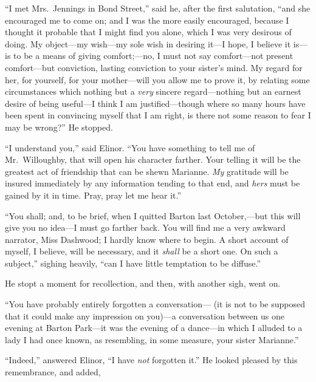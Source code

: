 ``I met Mrs.\ Jennings in Bond Street,'' said he,
after the first salutation, ``and she encouraged me
to come on; and I was the more easily encouraged,
because I thought it probable that I might find you alone,
which I was very desirous of doing.  My object---my
wish---my sole wish in desiring it---I hope, I believe
it is---is to be a means of giving comfort;---no, I must
not say comfort---not present comfort---but conviction,
lasting conviction to your sister's mind.  My regard for her,
for yourself, for your mother---will you allow me to prove it,
by relating some circumstances which nothing but a \emph{very}
sincere regard---nothing but an earnest desire of being
useful---I think I am justified---though where so many hours
have been spent in convincing myself that I am right,
is there not some reason to fear I may be wrong?''
He stopped.

``I understand you,'' said Elinor.  ``You have something
to tell me of Mr.\ Willoughby, that will open his character
farther.  Your telling it will be the greatest act of friendship
that can be shewn Marianne.  \emph{My} gratitude will be insured
immediately by any information tending to that end, and \emph{hers}
must be gained by it in time.  Pray, pray let me hear it.''

``You shall; and, to be brief, when I quitted Barton
last October,---but this will give you no idea---I must go
farther back.  You will find me a very awkward narrator,
Miss Dashwood; I hardly know where to begin.  A short
account of myself, I believe, will be necessary, and it
\emph{shall} be a short one.  On such a subject,'' sighing heavily,
``can I have little temptation to be diffuse.''

He stopt a moment for recollection, and then,
with another sigh, went on.

``You have probably entirely forgotten a conversation---%
(it is not to be supposed that it could make any impression
on you)---a conversation between us one evening at Barton
Park---it was the evening of a dance---in which I alluded
to a lady I had once known, as resembling, in some measure,
your sister Marianne.''

``Indeed,'' answered Elinor, ``I have \emph{not} forgotten it.''
He looked pleased by this remembrance, and added,

